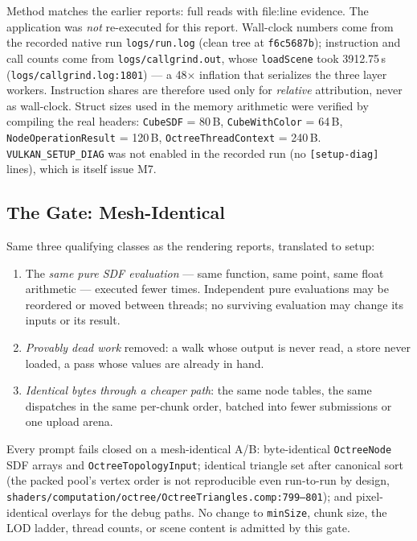 \documentclass[11pt,a4paper]{article}
\begin{document}
Method matches the earlier reports: full reads with file:line evidence.
The application was \emph{not} re-executed for this report. Wall-clock numbers
come from the recorded native run \texttt{logs/run.log} (clean tree at
\texttt{f6c5687b}); instruction and call counts come from
\texttt{logs/callgrind.out}, whose \texttt{loadScene} took 3912.75\,s
(\texttt{logs/callgrind.log:1801}) --- a 48$\times$ inflation that serializes
the three layer workers. Instruction shares are therefore used only for
\emph{relative} attribution, never as wall-clock. Struct sizes used in the
memory arithmetic were verified by compiling the real headers:
\texttt{CubeSDF} = 80\,B, \texttt{CubeWithColor} = 64\,B,
\texttt{NodeOperationResult} = 120\,B, \texttt{OctreeThreadContext} = 240\,B.
\texttt{VULKAN\_SETUP\_DIAG} was not enabled in the recorded run (no
\texttt{[setup-diag]} lines), which is itself issue M7.

\subsection{The Gate: Mesh-Identical}
\label{sec:gate29}

Same three qualifying classes as the rendering reports, translated to setup:

\begin{enumerate}[leftmargin=1.5em,itemsep=2pt]
\item The \emph{same pure SDF evaluation} --- same function, same point, same
float arithmetic --- executed fewer times. Independent pure evaluations may be
reordered or moved between threads; no surviving evaluation may change its
inputs or its result.
\item \emph{Provably dead work} removed: a walk whose output is never read, a
store never loaded, a pass whose values are already in hand.
\item \emph{Identical bytes through a cheaper path}: the same node tables, the
same dispatches in the same per-chunk order, batched into fewer submissions or
one upload arena.
\end{enumerate}

Every prompt fails closed on a mesh-identical A/B: byte-identical
\texttt{OctreeNode} SDF arrays and \texttt{OctreeTopologyInput}; identical
triangle set after canonical sort (the packed pool's vertex order is not
reproducible even run-to-run by design,
\texttt{shaders/computation/octree/OctreeTriangles.comp:799--801}); and
pixel-identical overlays for the debug paths. No change to \texttt{minSize},
chunk size, the LOD ladder, thread counts, or scene content is admitted by
this gate.
\end{document}
